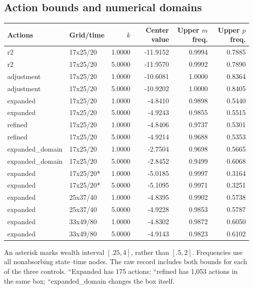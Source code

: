 \subsection{Action bounds and numerical domains}
\begingroup\footnotesize\setlength{\tabcolsep}{4pt}
\begin{longtable}{llrrrr}
\toprule Actions & Grid/time & $k$ & Center value & Upper $m$ freq. & Upper $p$ freq.\\\midrule\endhead
r2 & 17x25/20 & 1.0000 & -11.9152 & 0.9994 & 0.7885\\
r2 & 17x25/20 & 5.0000 & -11.9570 & 0.9992 & 0.7890\\
adjustment & 17x25/20 & 1.0000 & -10.6081 & 1.0000 & 0.8364\\
adjustment & 17x25/20 & 5.0000 & -10.9202 & 1.0000 & 0.8405\\
expanded & 17x25/20 & 1.0000 & -4.8410 & 0.9898 & 0.5440\\
expanded & 17x25/20 & 5.0000 & -4.9243 & 0.9855 & 0.5515\\
refined & 17x25/20 & 1.0000 & -4.8406 & 0.9737 & 0.5301\\
refined & 17x25/20 & 5.0000 & -4.9214 & 0.9688 & 0.5353\\
expanded\_domain & 17x25/20 & 1.0000 & -2.7504 & 0.9698 & 0.5665\\
expanded\_domain & 17x25/20 & 5.0000 & -2.8452 & 0.9499 & 0.6068\\
expanded & 17x25/20* & 1.0000 & -5.0185 & 0.9997 & 0.3164\\
expanded & 17x25/20* & 5.0000 & -5.1095 & 0.9971 & 0.3251\\
expanded & 25x37/40 & 1.0000 & -4.8395 & 0.9902 & 0.5738\\
expanded & 25x37/40 & 5.0000 & -4.9228 & 0.9853 & 0.5787\\
expanded & 33x49/80 & 1.0000 & -4.8302 & 0.9872 & 0.6050\\
expanded & 33x49/80 & 5.0000 & -4.9143 & 0.9823 & 0.6102\\
\bottomrule\end{longtable}\endgroup
An asterisk marks wealth interval $[.25,4]$, rather than $[.5,2]$. Frequencies use all nonabsorbing state--time nodes. The raw record includes both bounds for each of the three controls. ``Expanded has 175 actions; ``refined has 1,053 actions in the same box; ``expanded\_domain changes the box itself.
